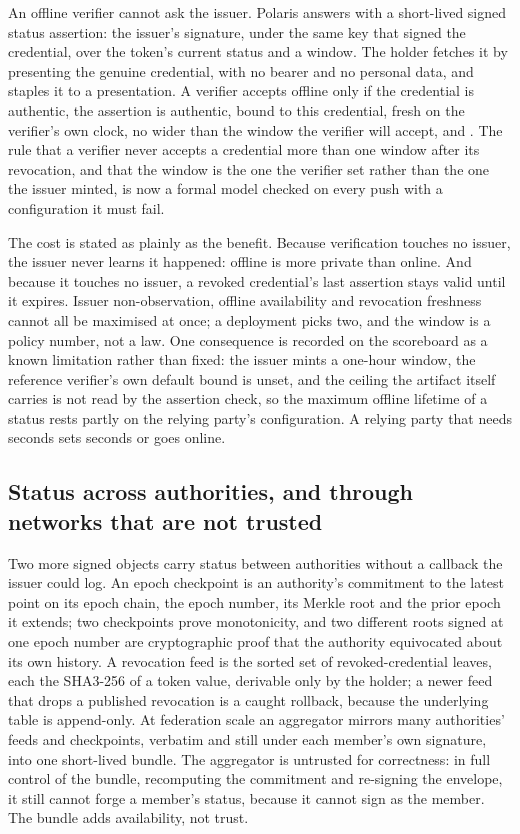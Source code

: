 An offline verifier cannot ask the issuer. Polaris answers with a short-lived signed status
assertion: the issuer's signature, under the same key that signed the credential, over the token's
current status and a window. The holder fetches it by presenting the genuine credential, with no
bearer and no personal data, and staples it to a presentation. A verifier accepts offline only if
the credential is authentic, the assertion is authentic, bound to this credential, fresh on the
verifier's own clock, no wider than the window the verifier will accept, and . The rule
that a verifier never accepts a credential more than one window after its revocation, and that the
window is the one the verifier set rather than the one the issuer minted, is now a formal model
checked on every push with a configuration it must fail. \sImpl

The cost is stated as plainly as the benefit. Because verification touches no issuer, the issuer
never learns it happened: offline is more private than online. And because it touches no issuer, a
revoked credential's last assertion stays valid until it expires. Issuer non-observation, offline
availability and revocation freshness cannot all be maximised at once; a deployment picks two, and
the window is a policy number, not a law. One consequence is recorded on the scoreboard as a known
limitation rather than fixed: the issuer mints a one-hour window, the reference verifier's own
default bound is unset, and the ceiling the artifact itself carries is not read by the assertion
check, so the maximum offline lifetime of a status rests partly on the relying party's configuration.
A relying party that needs seconds sets seconds or goes online.

\subsection{Status across authorities, and through networks that are not trusted}

Two more signed objects carry status between authorities without a callback the issuer could log.
An epoch checkpoint is an authority's commitment to the latest point on its epoch chain, the epoch
number, its Merkle root and the prior epoch it extends; two checkpoints prove monotonicity, and two
different roots signed at one epoch number are cryptographic proof that the authority equivocated
about its own history. A revocation feed is the sorted set of revoked-credential leaves, each the
SHA3-256 of a token value, derivable only by the holder; a newer feed that drops a published
revocation is a caught rollback, because the underlying table is append-only. At federation scale an
aggregator mirrors many authorities' feeds and checkpoints, verbatim and still under each member's
own signature, into one short-lived bundle. The aggregator is untrusted for correctness: in full
control of the bundle, recomputing the commitment and re-signing the envelope, it still cannot forge
a member's status, because it cannot sign as the member. The bundle adds availability, not trust.
\sImpl

